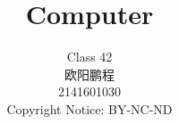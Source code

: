 \documentclass[]{report}
\title{Computer}
\author{Class 42 \\ 欧阳鹏程 \\ 2141601030 \\ Copyright Notice: BY-NC-ND}
\begin{document}
\maketitle

\begin{abstract}
\end{abstract}
\end{document}
